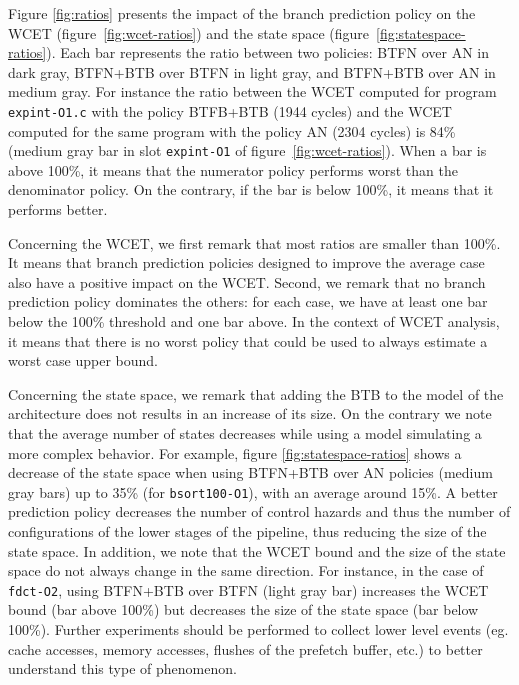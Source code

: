   Figure \ref{fig:ratios} presents the impact of the branch prediction policy on the WCET (figure~\ref{fig:wcet-ratios}) and the state space (figure~\ref{fig:statespace-ratios}).
  Each bar represents the ratio between two policies: BTFN over AN in dark gray, BTFN+BTB over BTFN in light gray, and BTFN+BTB over AN in medium gray.
  For instance the ratio between the WCET computed for program {\tt expint-O1.c} with the policy BTFB+BTB (1944 cycles) and the WCET computed for the same program with the policy AN (2304 cycles) is 84\% (medium gray bar in slot {\tt expint-O1} of figure~\ref{fig:wcet-ratios}).
  When a bar is above 100\%, it means that the numerator policy performs worst than the denominator policy.
  On the contrary, if the bar is below 100\%, it means that it performs better.
  
  Concerning the WCET, we first remark that most ratios are smaller than 100\%.
  It means that branch prediction policies designed to improve the average case also have a positive impact on the WCET.
  Second, we remark that no branch prediction policy dominates the others: for each case, we have at least one bar below the 100\% threshold and one bar above.
  In the context of WCET analysis, it means that there is no worst policy that could be used to always estimate a worst case upper bound.

  Concerning the state space, we remark that adding the BTB to the model of the architecture does not results in an increase of its size.
  On the contrary we note that the average number of states decreases while using a model simulating a more complex behavior. 
  For example, figure \ref{fig:statespace-ratios} shows a decrease of the state space when using BTFN+BTB over AN policies (medium gray bars) up to 35\% (for \texttt{bsort100-O1}), with an average around 15\%.
  A better prediction policy decreases the number of control hazards and thus the number of configurations of the lower stages of the pipeline, thus reducing the size of the state space.
  In addition, we note that the WCET bound and the size of the state space do not always change in the same direction.
  For instance, in the case of \texttt{fdct-O2}, using BTFN+BTB over BTFN (light gray bar) increases the WCET bound (bar above 100\%) but decreases the size of the state space (bar below 100\%).
  Further experiments should be performed to collect lower level events (eg. cache accesses, memory accesses, flushes of the prefetch buffer, etc.) to better understand this type of phenomenon.


